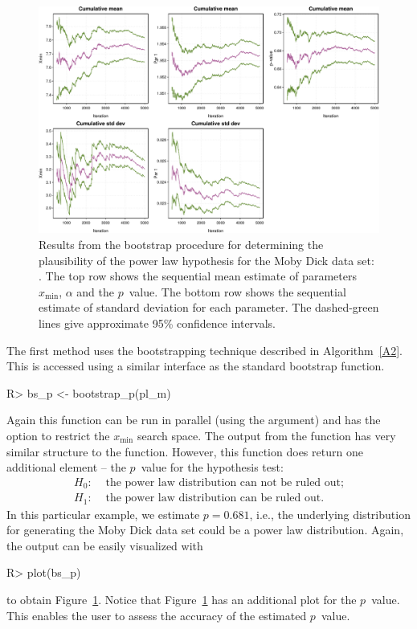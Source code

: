 \documentclass[article]{jss}
\newcommand{\xmin}{x_{\min}}
\begin{document}
\begin{figure}[t]
\centering 
\includegraphics[width=\textwidth]{figure4}
 \vspace*{-0.5cm}
 \caption{Results from the bootstrap procedure for determining the plausibility
   of the power law hypothesis for the Moby Dick data set:
   \mbox{}. The top row shows the sequential mean
   estimate of parameters $\xmin$, $\alpha$ and the $p$~value. The bottom row
   shows the sequential estimate of standard deviation for each parameter. The
   dashed-green lines give approximate 95\% confidence intervals. }\label{F4}
\end{figure}

The first method uses the bootstrapping technique described in Algorithm~\ref{A2}. This
is accessed using a similar interface as the standard bootstrap function.
\begin{Schunk}
\begin{Sinput}
R> bs_p <- bootstrap_p(pl_m)
\end{Sinput}
\end{Schunk}
%
Again this function can be run in parallel (using the  argument) and
has the option to restrict the $\xmin$ search space. The output from the
 function has very similar structure to the 
function. However, this function does return one additional element -- the
$p$~value for the hypothesis test:
\begin{align*}
H_0\!\!:& \text{ the power law distribution can not be ruled out;}\\
H_1\!\!:& \text{ the power law distribution can be ruled out.}
\end{align*}
In this particular example, we estimate $p=0.681$, i.e., the
underlying distribution for generating the Moby Dick data set could be
a power law distribution. Again, the output can be easily visualized with
\begin{Schunk}
\begin{Sinput}
R> plot(bs_p)
\end{Sinput}
\end{Schunk}
to obtain Figure~\ref{F4}. Notice that Figure~\ref{F4} has an additional plot
for the $p$~value. This enables the user to assess the accuracy of the estimated
$p$~value.
\end{document}

